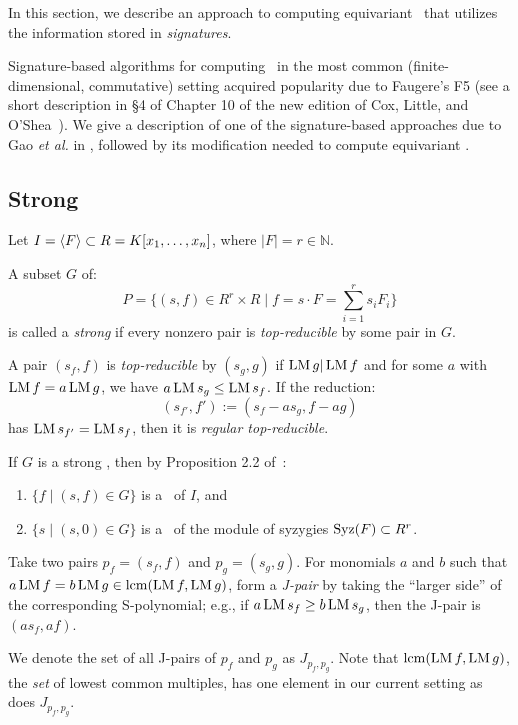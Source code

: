 In this section, we describe an approach to computing equivariant \GBs\ that utilizes the information stored in {\em signatures}. 

Signature-based algorithms for computing \GBs\ in the most common (finite-dimensional, commutative) setting acquired popularity due to Faugere's F5 (see a short description in \S 4 of Chapter 10 of the new edition of Cox, Little, and O'Shea~\cite{Cox-Little-OShea:I-V-A}).      
We give a description of one of the signature-based approaches due to Gao {\em et al.} in \cite{Gao-Volny-Wang:signature-GBs}, followed by its modification needed to compute equivariant \GBs.  

\subsection{Strong \GB}

Let $I=\langle F \rangle \subset R=K[x_1,\ldots,x_n]$, where $|F|=r\in\mathbb N$.

A subset $G$ of:
\[
P = \{(s,f)\in R^r\times R \mid f=s\cdot F = \sum_{i=1}^r s_iF_i\}
\]
is called a {\em strong \GB } if every nonzero pair is {\em top-reducible} by some pair in $G$.

A pair $(s_f,f)$ is {\em top-reducible} by $(s_g,g)$ if $\operatorname{LM} g |\operatorname{LM} f$ and 
for some $a$ with $\operatorname{LM} f = a \operatorname{LM} g$, we have $a\operatorname{LM} s_g\leq \operatorname{LM} s_f$.  If the reduction:
\[
(s_{f'},f') := (s_f-as_g,f-ag)
\]
has $\operatorname{LM} s_{f'} = \operatorname{LM} s_f$, then it is {\em regular top-reducible}.

If $G$ is a strong \GB, then by Proposition 2.2 of~\cite{Gao-Volny-Wang:signature-GBs}:
\begin{enumerate}
   \item $\{f \mid (s,f)\in G\}$ is a \GB\ of $I$, and 
   \item $\{s \mid (s,0)\in G\}$ is a \GB\ of the module of syzygies $\operatorname{Syz}(F) \subset R^r$.
\end{enumerate}
   
Take two pairs $p_f=(s_f,f)$ and $p_g=(s_g,g)$. For monomials $a$ and $b$ such that $a\operatorname{LM} f = b\operatorname{LM} g \in \operatorname{lcm}(\operatorname{LM} f,\operatorname{LM} g)$, form a {\em J-pair} by taking the ``larger side'' of the corresponding S-polynomial; e.g., if $a\operatorname{LM} s_f \geq b\operatorname{LM} s_g$, then the J-pair is $(as_f,af)$.

We denote the set of all J-pairs of $p_f$ and $p_g$ as $J_{p_f,p_g}$. Note that $\operatorname{lcm}(\operatorname{LM} f,\operatorname{LM} g)$, the {\em set} of lowest common multiples, has one element in our current setting as does $J_{p_f,p_g}$.  

